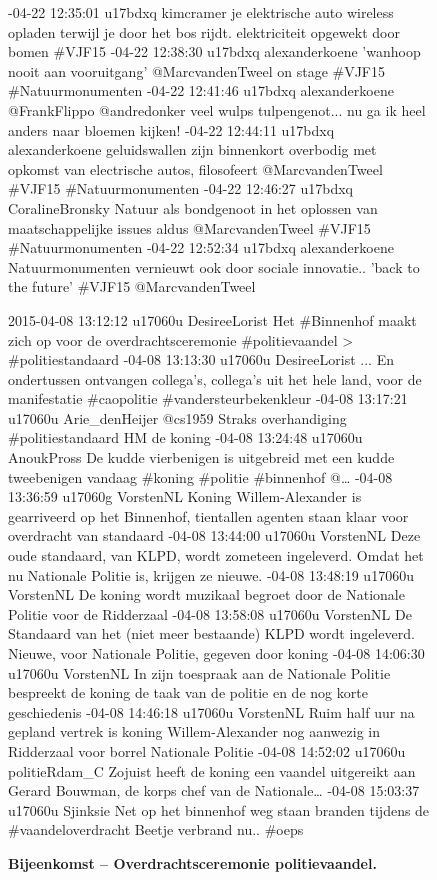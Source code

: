 {{\begin{figure}[H]
\begin{framed}
{-04-22 12:35:01 u17bdxq kimcramer je elektrische auto wireless opladen terwijl je door het bos rijdt. elektriciteit opgewekt door bomen \#VJF15
-04-22 12:38:30 u17bdxq alexanderkoene 'wanhoop nooit aan vooruitgang' @MarcvandenTweel on stage \#VJF15 \#Natuurmonumenten
-04-22 12:41:46 u17bdxq alexanderkoene @FrankFlippo @andredonker veel wulps tulpengenot... nu ga ik heel anders naar bloemen kijken!
-04-22 12:44:11 u17bdxq alexanderkoene geluidswallen zijn binnenkort overbodig met opkomst van electrische autos, filosofeert @MarcvandenTweel \#VJF15 \#Natuurmonumenten
-04-22 12:46:27 u17bdxq CoralineBronsky Natuur als bondgenoot in het oplossen van maatschappelijke issues aldus @MarcvandenTweel \#VJF15 \#Natuurmonumenten
-04-22 12:52:34 u17bdxq alexanderkoene Natuurmonumenten vernieuwt ook door sociale innovatie.. 'back to the future' \#VJF15 @MarcvandenTweel
}
\end{framed}
\end{figure}

\begin{figure}[H]
 \caption{\bf{Bijeenkomst} – Overdrachtsceremonie politievaandel.}
\vspace*{-10pt} 
\begin{framed}
\footnotesize{
2015-04-08 13:12:12 u17060u DesireeLorist Het \#Binnenhof maakt zich op voor de overdrachtsceremonie \#politievaandel > \#politiestandaard
-04-08 13:13:30 u17060u DesireeLorist ... En ondertussen ontvangen collega's, collega's uit het hele land, voor de manifestatie \#caopolitie \#vandersteurbekenkleur
-04-08 13:17:21 u17060u Arie\_denHeijer @cs1959 Straks overhandiging \#politiestandaard HM de koning
-04-08 13:24:48 u17060u AnoukPross De kudde vierbenigen is uitgebreid met een kudde tweebenigen vandaag \#koning \#politie \#binnenhof @…
-04-08 13:36:59 u17060g VorstenNL Koning Willem-Alexander is gearriveerd op het Binnenhof, tientallen agenten staan klaar voor overdracht van standaard
-04-08 13:44:00 u17060u VorstenNL Deze oude standaard, van KLPD, wordt zometeen ingeleverd. Omdat het nu Nationale Politie is, krijgen ze nieuwe.
-04-08 13:48:19 u17060u VorstenNL De koning wordt muzikaal begroet door de Nationale Politie voor de Ridderzaal
-04-08 13:58:08 u17060u VorstenNL De Standaard van het (niet meer bestaande) KLPD wordt ingeleverd. Nieuwe, voor Nationale Politie, gegeven door koning
-04-08 14:06:30 u17060u VorstenNL In zijn toespraak aan de Nationale Politie bespreekt de koning de taak van de politie en de nog korte geschiedenis
-04-08 14:46:18 u17060u VorstenNL Ruim half uur na gepland vertrek is koning Willem-Alexander nog aanwezig in Ridderzaal voor borrel Nationale Politie
-04-08 14:52:02 u17060u politieRdam\_C Zojuist heeft de koning een vaandel uitgereikt aan Gerard Bouwman, de korps chef van de Nationale…
-04-08 15:03:37 u17060u Sjinksie Net op het binnenhof weg staan branden tijdens de \#vaandeloverdracht Beetje verbrand nu.. \#oeps
}
\end{framed}
\end{figure}

}}
